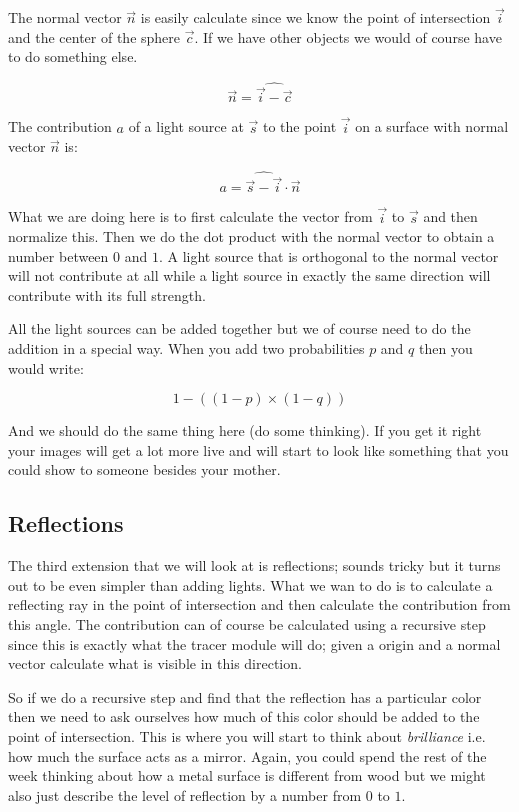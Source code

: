 \documentclass[a4paper,11pt]{article}
\begin{document}
The normal vector $\vec{n}$ is easily calculate since we know the point
of intersection $\vec{i}$ and the center of the sphere $\vec{c}$. If
we have other objects we would of course have to do something else.

$$ \vec{n} = \widehat{\vec{i} - \vec{c}} $$

The contribution $a$ of a light source at $\vec{s}$ to the point
$\vec{i}$ on a surface with normal vector $\vec{n}$ is:

$$a =  \widehat{\vec{s} - \vec{i}} \cdot \vec{n}$$

What we are doing here is to first calculate the vector from $\vec{i}$
to $\vec{s}$ and then normalize this. Then we do the dot product with
the normal vector to obtain a number between $0$ and $1$.  A light
source that is orthogonal to the normal vector will not contribute at
all while a light source in exactly the same direction will contribute
with its full strength.

All the light sources can be added together but we of course need to
do the addition in a special way. When you add two probabilities $p$
and $q$ then you would write:

$$ 1 - ((1-p) \times (1-q))$$

And we should do the same thing here (do some thinking). If you get it
right your images will get a lot more live and will start to look like
something that you could show to someone besides your mother.

\subsection*{Reflections}

The third extension that we will look at is reflections; sounds tricky
but it turns out to be even simpler than adding lights. What we wan to
do is to calculate a reflecting ray in the point of intersection and
then calculate the contribution from this angle. The contribution can
of course be calculated using a recursive step since this is exactly
what the tracer module will do; given a origin and a normal vector
calculate what is visible in this direction. 

So if we do a recursive step and find that the reflection has a
particular color then we need to ask ourselves how much of this color
should be added to the point of intersection. This is where you will
start to think about {\em brilliance} i.e. how much the surface acts as
a mirror. Again, you could spend the rest of the week thinking about
how a metal surface is different from wood but we might also just
describe the level of reflection by a number from $0$ to $1$.
\end{document}
